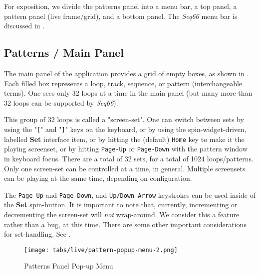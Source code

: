    For exposition, we divide the patterns panel
   into a menu bar, a top panel, a pattern panel (live frame/grid),
   and a bottom panel.
   The \textsl{Seq66} menu bar is discussed in .

\subsection{Patterns / Main Panel}
\label{subsec:patterns_panel_main}

   The main panel of the application provides a grid of empty boxes,
   as shown in
   .
   Each filled box represents a loop, track, sequence, or pattern
   (interchangeable terms).
   One sees only 32 loops at a time in the main panel (but many more than
   32 loops can be supported by \textsl{Seq66}).

   This group of 32 loops is called a "screen-set".
   One can switch between sets by using the
   \index{keys![}
   "\texttt{[}" and
   \index{keys!]}
   "\texttt{]}" keys on the keyboard, or by using
   the spin-widget-driven, labelled \textbf{Set} interface item, or
   by hitting the (default) \texttt{Home} key to make it the playing screenset,
   or by hitting \texttt{Page-Up} or \texttt{Page-Down} with the pattern window
   in keyboard focus.
   There are a total of 32 sets, for a total of 1024 loops/patterns. 
   Only one screen-set can be controlled at a time, in general.
   Multiple screensets can be playing at the same time, depending on
   configuration.

   The \texttt{Page Up} and \texttt{Page Down}, and \texttt{Up/Down Arrow}
   keystrokes can be used inside of the \textbf{Set} spin-button.
   It is important to note that, currently, incrementing or decrementing
   the screen-set will \textsl{not} wrap-around.
   We consider this a feature rather than a bug, at this time.
   There are some other important considerations for set-handling.
   See .

\begin{figure}[H]
   \centering 
   \texttt{[image: tabs/live/pattern-popup-menu-2.png]}
   \caption{Patterns Panel Pop-up Menu}
   \label{fig:patterns_panel_popup_menu}
\end{figure}

